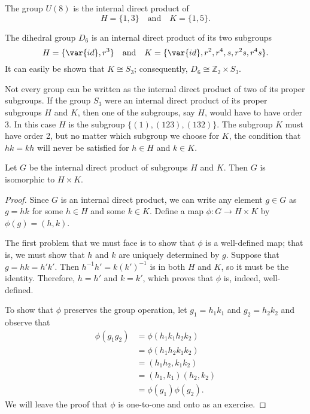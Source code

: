  
\begin{example}\label{example:isomorph:U8}
The group $U(8)$ is the internal direct product of
\[
H  = \{1, 3 \} \quad \text{and} \quad K  = \{1, 5 \}.
\]
\end{example}

 
\begin{example}\label{example:isomorph:D6_product}
The dihedral group $D_6$ is an internal direct product of its two
subgroups 
\[
H  = \{\var{id}, r^3  \} \quad \text{and} \quad
K  = \{\var{id}, r^2, r^4, s, r^2s, r^4 s   \}.
\]
It can easily be shown that $K \cong S_3$; consequently, $D_6 \cong
{\mathbb Z}_2 \times S_3$. 
\end{example}

 
\begin{example}\label{example:isomorph:S3_not_a_product}
Not every group can be written as the internal direct product of two
of its proper subgroups.  If the group $S_3$ were an internal direct
product of its proper subgroups $H$ and $K$, then one of the  subgroups,
say $H$, would have to have order 3. In this case $H$ is the subgroup $\{
(1), (123), (132) \}$. The subgroup $K$ must have order 2, but no
matter which subgroup we choose for $K$, the condition that $hk = kh$
will never be satisfied for $h \in H$ and $k \in K$.
\mbox{\hspace{1in}}
\end{example}

 
\begin{thm}
Let $G$ be the internal direct product of  subgroups $H$ and $K$. Then
$G$ is isomorphic to $H \times K$. 
\end{thm}
 

\begin{proof}
Since $G$ is an internal direct product, we can write any element $g
\in G$ as $g =hk$ for some $h \in H$ and some $k \in K$. Define a map
$\phi : G \rightarrow H \times K$ by $\phi(g) = (h,k)$.

 
The first problem that we must face is to show that $\phi$ is a
well-defined map; that is, we must show that $h$ and $k$ are uniquely
determined by $g$. Suppose that $g = hk=h'k'$. Then $h^{-1} h'= k
(k')^{-1}$ is in both $H$ and $K$, so it must be the identity.
Therefore, $h = h'$ and $k = k'$, which proves that $\phi$ is, indeed,
well-defined. 

 
To show that $\phi$ preserves the group operation, let $g_1 = h_1 k_1$
and $g_2 = h_2 k_2$ and observe that 
\begin{align*}
\phi( g_1 g_2 ) & = \phi( h_1 k_1 h_2 k_2 )\\
& = \phi(h_1  h_2 k_1 k_2) \\
& = (h_1  h_2, k_1 k_2) \\
& = (h_1, k_1)( h_2, k_2) \\
& = \phi( g_1 ) \phi(  g_2 ).
\end{align*}
We will leave the proof that $\phi$ is one-to-one and onto
as an exercise.
\end{proof}

